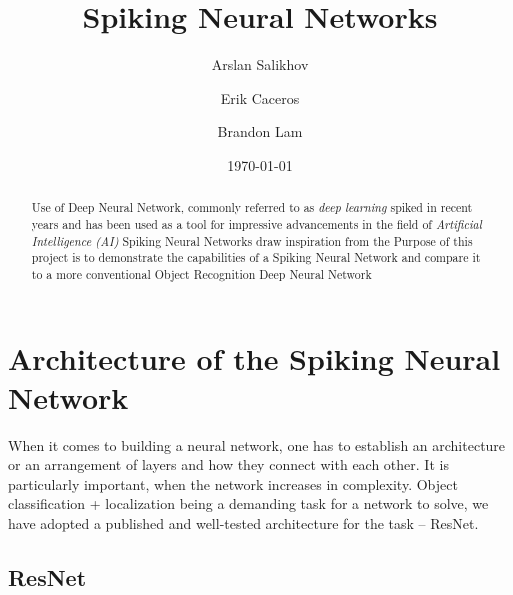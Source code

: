\documentclass{article}
\title{Spiking Neural Networks}
\author{Arslan Salikhov \\
	\and 
	Erik Caceros \\
	\and
	Brandon Lam \\
	}
\date{\today}
\begin{document}
\begin{titlingpage}
\maketitle
\begin{abstract}
	Use of Deep Neural Network, commonly referred to as
	\emph{deep learning} spiked in recent years and has been used
	as a tool for impressive advancements in the field of 
	\emph{Artificial Intelligence (AI)}
	Spiking Neural Networks draw inspiration from the 
	Purpose of this project is to demonstrate the capabilities of a 
	Spiking Neural Network and compare it to a more conventional 
	Object Recognition Deep Neural Network
	\end{abstract}
\end{titlingpage}


\tableofcontents
\newpage




\section{Architecture of the Spiking Neural Network}

When it comes to building a neural network, one has to establish an
architecture or an arrangement of layers and how they connect with each other.
It is particularly important, when the network increases in complexity. Object
classification + localization being a demanding task for a network to solve,
we have adopted a published and well-tested architecture for the task --
ResNet.

\subsection{ResNet}
\end{document}
